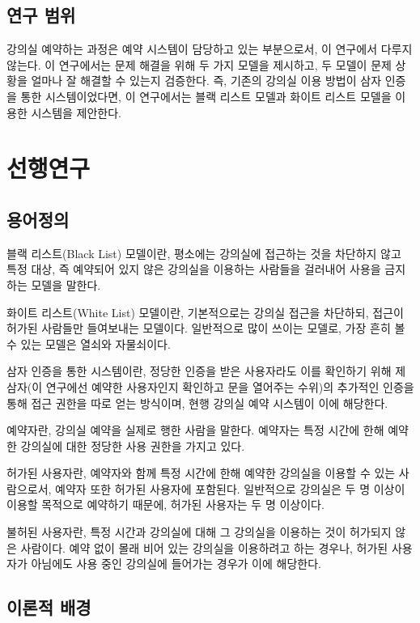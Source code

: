 \documentclass[11pt,a4paper]{article}
\begin{document}
\subsection{연구 범위}
강의실 예약하는 과정은 예약 시스템이 담당하고 있는 부분으로서, 이 연구에서
다루지 않는다. 이 연구에서는 문제 해결을 위해 두 가지 모델을 제시하고, 두
모델이 문제 상황을 얼마나 잘 해결할 수 있는지 검증한다. 즉, 기존의 강의실 이용
방법이 삼자 인증을 통한 시스템이었다면, 이 연구에서는 블랙 리스트 모델과 화이트
리스트 모델을 이용한 시스템을 제안한다.

\section{선행연구}

\subsection{용어정의}
블랙 리스트(Black List) 모델이란, 평소에는 강의실에 접근하는 것을 차단하지 않고
특정 대상, 즉 예약되어 있지 않은 강의실을 이용하는 사람들을 걸러내어 사용을
금지하는 모델을 말한다.

화이트 리스트(White List) 모델이란, 기본적으로는 강의실 접근을 차단하되, 접근이
허가된 사람들만 들여보내는 모델이다. 일반적으로 많이 쓰이는 모델로, 가장 흔히
볼 수 있는 모델은 열쇠와 자물쇠이다.

삼자 인증을 통한 시스템이란, 정당한 인증을 받은 사용자라도 이를 확인하기 위해
제삼자(이 연구에선 예약한 사용자인지 확인하고 문을 열어주는 수위)의 추가적인
인증을 통해 접근 권한을 따로 얻는 방식이며, 현행 강의실 예약 시스템이 이에
해당한다.

예약자란, 강의실 예약을 실제로 행한 사람을 말한다. 예약자는 특정 시간에 한해
예약한 강의실에 대한 정당한 사용 권한을 가지고 있다.

허가된 사용자란, 예약자와 함께 특정 시간에 한해 예약한 강의실을 이용할 수 있는
사람으로서, 예약자 또한 허가된 사용자에 포함된다. 일반적으로 강의실은 두 명
이상이 이용할 목적으로 예약하기 때문에, 허가된 사용자는 두 명 이상이다.

불허된 사용자란, 특정 시간과 강의실에 대해 그 강의실을 이용하는 것이 허가되지
않은 사람이다. 예약 없이 몰래 비어 있는 강의실을 이용하려고 하는 경우나, 허가된
사용자가 아님에도 사용 중인 강의실에 들어가는 경우가 이에 해당한다.

\subsection{이론적 배경}
\end{document}
